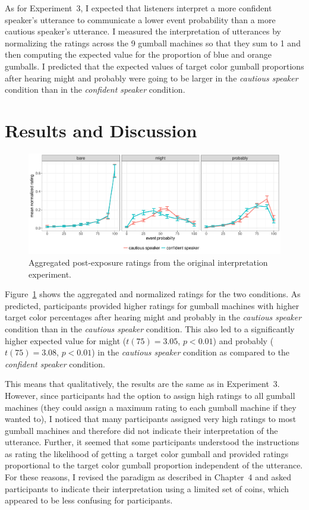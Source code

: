 As for Experiment~3, I expected that listeners interpret a more confident speaker's utterance 
to communicate a lower event probability than a more cautious speaker's utterance. I measured
the interpretation of utterances by normalizing the ratings across the 9 gumball machines so that they sum to
1 and then computing the expected value for the proportion of blue and orange gumballs. 
I predicted that the expected values of target color gumball proportions after hearing {\sc might} and {\sc probably} 
were going to be larger in the \emph{cautious speaker} condition than in the \emph{confident speaker} condition.

\section{Results and Discussion}

\begin{figure}[h!]
\includegraphics[width=\textwidth]{plots/fig-G1-exp-2-ratings-orig.pdf}
\caption{Aggregated post-exposure ratings from the original interpretation experiment.  \label{fig:adaptation-results-comp-orig}}
\end{figure}

Figure~\ref{fig:adaptation-results-comp-orig} shows the aggregated and normalized ratings for the two conditions.  As predicted, participants provided higher ratings for gumball machines with higher target color percentages after hearing {\sc might} and {\sc probably} in the \emph{cautious speaker} condition than in the \emph{cautious speaker} condition. This also led to a significantly higher expected value for {\sc might} ($t(75)=3.05$, $p<0.01$) and {\sc probably} ($t(75)=3.08$, $p<0.01$) in the \emph{cautious speaker} condition as compared to the \emph{confident speaker} condition.

This means that qualitatively, the results are the same as in Experiment~3. However, since participants had the option to assign high 
ratings to 
all gumball machines (they could assign a maximum rating to each gumball machine if they wanted to), I noticed that many participants assigned very high ratings to most gumball 
machines and therefore did not indicate their interpretation of the utterance. Further, it seemed that some participants
understood the instructions as rating the likelihood of getting a target color gumball and provided ratings proportional to the 
target color gumball proportion independent of the utterance. For these reasons, I revised the paradigm as described
in Chapter~4 and asked participants to indicate their interpretation using a limited set of coins, which appeared to be less
confusing for participants. 
